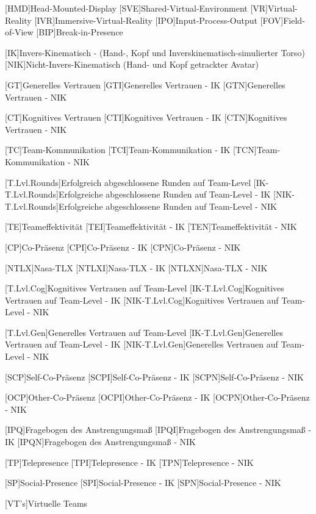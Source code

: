 \begin{acronym}
	[HMD]{Head-Mounted-Display}
	[SVE]{Shared-Virtual-Environment}
	[VR]{Virtual-Reality}
	[IVR]{Immersive-Virtual-Reality}
	[IPO]{Input-Process-Output}
	[FOV]{Field-of-View}
	[BIP]{Break-in-Presence}
	
	[IK]{Invers-Kinematisch - (Hand-, Kopf und Inverskinematisch-simulierter Torso)}
	[NIK]{Nicht-Invers-Kinematisch (Hand- und Kopf getrackter Avatar)}
	
	[GT]{Generelles Vertrauen}
	[GTI]{Generelles Vertrauen - IK}
	[GTN]{Generelles Vertrauen - NIK}
	
	[CT]{Kognitives Vertrauen}
	[CTI]{Kognitives Vertrauen - IK}
	[CTN]{Kognitives Vertrauen - NIK}
	
	[TC]{Team-Kommunikation}
	[TCI]{Team-Kommunikation - IK}
	[TCN]{Team-Kommunikation - NIK}
	
	[T.Lvl.Rounds]{Erfolgreich abgeschlossene Runden auf Team-Level}
	[IK-T.Lvl.Rounds]{Erfolgreiche abgeschlossene Runden auf Team-Level - IK}
	[NIK-T.Lvl.Rounds]{Erfolgreiche abgeschlossene Runden auf Team-Level - NIK}
	
	[TE]{Teameffektivität}
	[TEI]{Teameffektivität - IK}
	[TEN]{Teameffektivität - NIK}
	
	[CP]{Co-Präsenz}
	[CPI]{Co-Präsenz - IK}
	[CPN]{Co-Präsenz - NIK}
	
	[NTLX]{Nasa-TLX}
	[NTLXI]{Nasa-TLX - IK}
	[NTLXN]{Nasa-TLX - NIK}
	
	[T.Lvl.Cog]{Kognitives Vertrauen auf Team-Level}
	[IK-T.Lvl.Cog]{Kognitives Vertrauen auf Team-Level - IK}
	[NIK-T.Lvl.Cog]{Kognitives Vertrauen auf Team-Level - NIK}
	
	[T.Lvl.Gen]{Generelles Vertrauen auf Team-Level}
	[IK-T.Lvl.Gen]{Generelles Vertrauen auf Team-Level - IK}
	[NIK-T.Lvl.Gen]{Generelles Vertrauen auf Team-Level - NIK}
	
	[SCP]{Self-Co-Präsenz}
	[SCPI]{Self-Co-Präsenz - IK}
	[SCPN]{Self-Co-Präsenz - NIK}	
	
	[OCP]{Other-Co-Präsenz}
	[OCPI]{Other-Co-Präsenz - IK}
	[OCPN]{Other-Co-Präsenz - NIK}	
	
	[IPQ]{Fragebogen des Anstrengungsmaß}
	[IPQI]{Fragebogen des Anstrengungsmaß - IK}
	[IPQN]{Fragebogen des Anstrengungsmaß - NIK}
	
	[TP]{Telepresence}
	[TPI]{Telepresence - IK}
	[TPN]{Telepresence - NIK}	
	
	[SP]{Social-Presence}
	[SPI]{Social-Presence - IK}
	[SPN]{Social-Presence - NIK}
	
	[VT's]{Virtuelle Teams}
\end{acronym}
